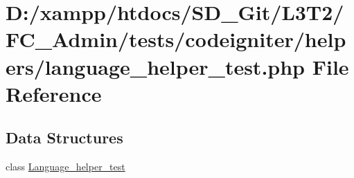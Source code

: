 \hypertarget{language__helper__test_8php}{}\section{D\+:/xampp/htdocs/\+S\+D\+\_\+\+Git/\+L3\+T2/\+F\+C\+\_\+\+Admin/tests/codeigniter/helpers/language\+\_\+helper\+\_\+test.php File Reference}
\label{language__helper__test_8php}
\subsection*{Data Structures}
\begin{DoxyCompactItemize}
\item 
class \hyperlink{class_language__helper__test}{Language\+\_\+helper\+\_\+test}
\end{DoxyCompactItemize}
